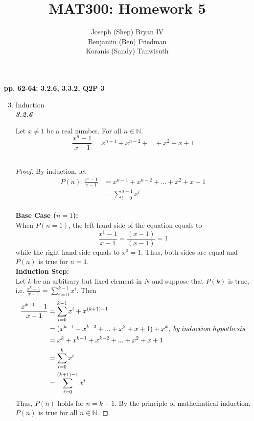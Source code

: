\documentclass{article}
\begin{document}
\title{MAT300: Homework 5}
\author{
	Joseph (Shep) Bryan IV \\
	Benjamin (Ben) Friedman\\
	Koranis (Sandy) Tanwisuth
}

\maketitle
	\begin{flushleft}
		\textbf{pp. 62-64: 3.2.6, 3.3.2, Q2P 3}
	\begin{enumerate}
		\setcounter{enumi}{2}
		\item Induction \\
		
		\textbf{\textit{3.2.6}}
		\begin{flushleft}
			Let $x \neq 1$ be a real number. For all $n \in \mathbb{N}$. 
			\begin{equation}
				\frac{x^n-1}{x-1} = x^{n-1}+x^{n-2}+...+x^2+x+1
			\end{equation}
			\\
			\begin{proof}
				By induction, let \\
				\begin{align*}
					P(n): \frac{x^n-1}{x-1} & = x^{n-1}+x^{n-2}+...+x^2+x+1 \\
					& = \sum\limits_{i=0}^{n-1} x^i
				\end{align*} \\
				\textbf{Base Case ($n = 1$):}
				\\ When $P(n=1)$, the left hand side of the equation equals to \[\frac{x^1-1}{x-1} = \frac{(x-1)}{(x-1)}  = 1 \]
				while the right hand side equals to $x^0 = 1$. Thus, both sides are equal and $P(n)$ is true for $n=1$.
				\\
				\pagebreak
				\textbf{Induction Step:}
				\\
				Let $k$ be an arbitrary but fixed element in $N$ and suppose that $P(k)$ is true, i.e. $\frac{x^k-1}{x-1} = \sum\limits_{i=0}^{k-1} x^i$. Then
				\begin{align*}
					\frac{x^{k+1}-1}{x-1}
					& = \sum\limits_{i=0}^{k-1} x^i + x^{(k+1)-1} \\
					& = (x^{k-1}+x^{k-2}+...+x^2+x+1) + x^k, \thickspace by \thickspace induction \thickspace hypothesis \\
					& = x^k+x^{k-1}+x^{k-2}+...+x^2+x+1 \\
					& = \sum\limits_{i=0}^{k} x^i \\
					& = \sum\limits_{i=0}^{(k+1)-1} x^i 
				\end{align*}
				Thus, $P(n)$ holds for $n=k+1$. 
				By the principle of mathematical induction, $P(n)$ is true for all $n \in \mathbb{N}$.
			\end{proof}
			

\end{flushleft}
\end{enumerate}
\end{flushleft}
\end{document}
